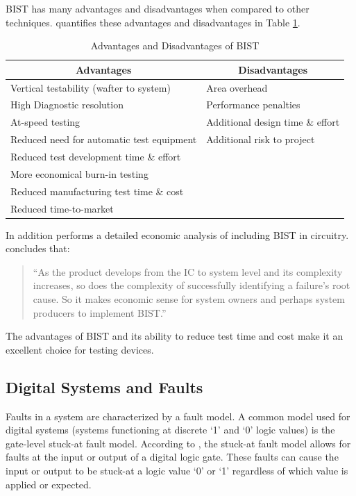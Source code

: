 \documentclass[12pt]{report}
\begin{document}
BIST has many advantages and disadvantages when compared to other techniques.  \cite{stroud} quantifies these advantages and disadvantages in Table \ref{tbl:advantages}. 
\begin{table}
	\caption{Advantages and Disadvantages of BIST\cite{stroud}}
	\begin{center}
	\begin{tabular}{|l|l|}
		\hline
		\multicolumn{1}{|c|}{{\bf Advantages}} & \multicolumn{1}{|c|}{{\bf Disadvantages}} \\ \hline
		Vertical testability (wafter to system) & Area overhead \\ \hline
		High Diagnostic resolution & Performance penalties \\ \hline
		At-speed testing & Additional design time \& effort \\ \hline
		Reduced need for automatic test equipment & Additional risk to project \\ \hline
		Reduced test development time \& effort & \\ \hline
		More economical burn-in testing & \\ \hline
		Reduced manufacturing test time \& cost & \\ \hline
		Reduced time-to-market & \\ \hline
	\end{tabular}
	\end{center}
	\label{tbl:advantages}
\end{table}
In addition \cite{ungar} performs a detailed economic analysis of including BIST in circuitry. \cite{ungar} concludes that:
\begin{quote}
``As the product develops from the IC to system level and its complexity increases, so does the complexity of successfully identifying a failure's root cause.  So it makes economic sense for system owners and perhaps system producers to implement BIST.\cite{ungar}''
\end{quote}
The advantages of BIST and its ability to reduce test time and cost make it an excellent choice for testing devices\cite{zorian}.

\subsection{Digital Systems and Faults}
Faults in a system are characterized by a fault model.  A common model used for digital systems (systems functioning at discrete `1' and `0' logic values) is the gate-level stuck-at fault model\cite{stroud}.  According to \cite{stroud}, the stuck-at fault model allows for faults at the input or output of a digital logic gate.  These faults can cause the input or output to be stuck-at a logic value `0' or `1' regardless of which value is applied or expected.  
\end{document}
